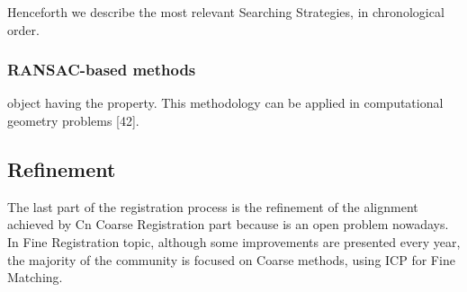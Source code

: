 Henceforth we describe the most relevant Searching Strategies, in chronological order.

\subsubsection{RANSAC-based methods}
 
object having the property. This methodology can be applied in computational geometry problems
[42].

\subsection{Refinement}
The last part of the registration process is the refinement of the alignment achieved by Cn Coarse Registration part because is an open problem
nowadays. In Fine Registration topic, although some improvements are presented every year, the
majority of the community is focused on Coarse methods, using ICP for Fine Matching.
